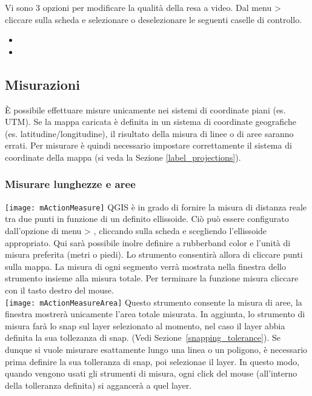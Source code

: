 \label{label_renderquality}

Vi sono 3 opzioni per modificare la qualità della resa a video. Dal menu
 >  cliccare sulla scheda
 e selezionare o deselezionare le seguenti caselle di controllo.
\begin{itemize}
\item {}
\item {}
\end{itemize}


\subsection{Misurazioni}\label{sec:measure}

È possibile effettuare misure unicamente nei sistemi di coordinate piani
(es. UTM). Se la mappa caricata è definita in un sistema di coordinate
geografiche (es. latitudine/longitudine), il risultato della misura di linee o
di aree saranno errati. Per misurare è quindi necessario impostare
correttamente il sistema di coordinate della mappa (si veda la Sezione \ref{label_projections}).

\subsubsection{Misurare lunghezze e aree}
\texttt{[image: mActionMeasure]} 
QGIS è in grado di fornire la misura di distanza reale tra due punti in
funzione di un definito ellissoide. Ciò può essere configurato dall'opzione di
menu  > , 
cliccando sulla scheda  e scegliendo l'ellissoide
appropriato. Qui sarà possibile inolre definire  a rubberband color e l'unità di misura preferita 
(metri o piedi). Lo strumento consentirà allora di cliccare punti sulla mappa.
La misura di ogni segmento verrà mostrata nella finestra dello strumento insieme alla misura totale. Per terminare la funzione misura cliccare con il
tasto destro del mouse. \\
\texttt{[image: mActionMeasureArea]} Questo strumento consente la
misura di aree, la finestra mostrerà unicamente l'area totale misurata.
In aggiunta, lo strumento di misura farà lo snap sul layer selezionato al momento, nel caso il layer abbia definita la sua tollezanza di snap. 
(Vedi Sezione~\ref{snapping_tolerance}). 
Se dunque si vuole misurare esattamente lungo una linea o un poligono, è necessario prima definire la sua tolleranza di snap, poi selezionae il layer. 
In questo modo, quando vengono usati gli strumenti di misura, ogni click del mouse (all'interno della tolleranza definita) si aggancerà a quel layer. 

